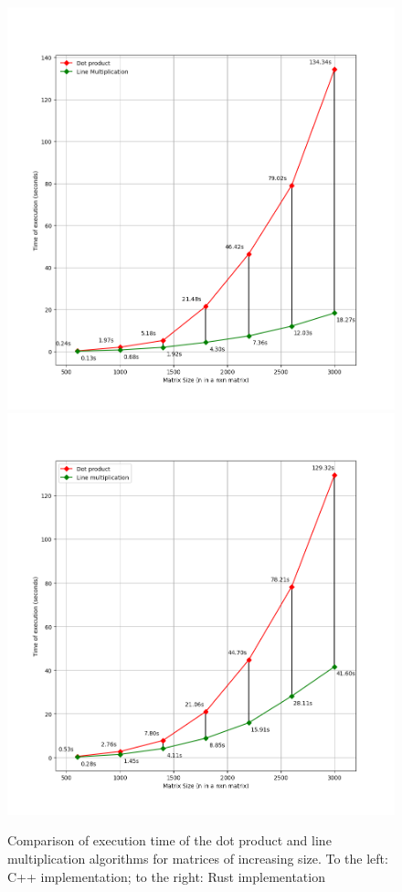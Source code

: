 \documentclass{report}
\begin{document}
				\begin{figure}[H]
					\begin{adjustbox}{center}
						\includegraphics[scale=0.4]{cpp_dot_line_comparison.png}
						\includegraphics[scale=0.4]{rs_algorithm_comparison.png}
					\end{adjustbox}
					\caption{Comparison of execution time of the dot product and line multiplication algorithms for matrices of increasing size. To the left: C++ implementation; to the right: Rust implementation}
				\end{figure}
			
\end{document}
